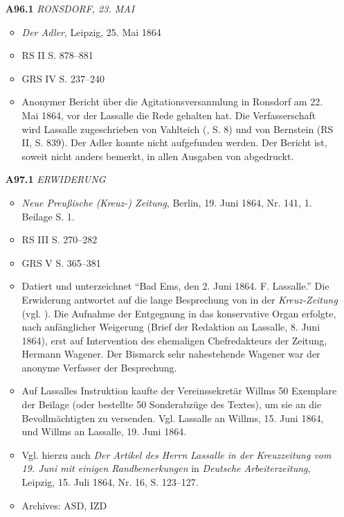 \begin{itemize}
    \item[\textbf{A96.1}] \textit{RONSDORF, 23. MAI}
    \begin{itemize} 
    	\item \textit{Der Adler}, Leipzig, 25. Mai 1864
    	\item RS II S. 878--881
    	\item GRS IV S. 237--240
    	\item Anonymer Bericht über die Agitationsversanmlung in Ronsdorf am 22. Mai 1864, vor der Lassalle die Rede  gehalten hat. Die Verfasserschaft wird Lassalle zugeschrieben von Vahlteich (, S. 8) und von Bernstein (RS II, S. 839). Der Adler konnte nicht aufgefunden werden. Der Bericht ist, soweit nicht anders bemerkt, in allen Ausgaben von  abgedruckt.
    \end{itemize}
    
    \item[\textbf{A97.1}] \textit{ERWIDERUNG}
    \begin{itemize}
        \item \textit{Neue Preußische (Kreuz-) Zeitung}, Berlin, 19. Juni 1864, Nr. 141, 1. Beilage S. 1.
        \item RS III S. 270--282
        \item GRS V S. 365--381
        \item Datiert und unterzeichnet ``Bad Ems, den 2. Juni 1864. F. Lassalle.'' Die Erwiderung antwortet auf die lange Besprechung von  in der \textit{Kreuz-Zeitung} (vgl. ). Die Aufnahme der Entgegnung in das konservative Organ erfolgte, nach anfänglicher Weigerung (Brief der Redaktion an Lassalle, 8. Juni 1864), erst auf Intervention des ehemaligen Chefredakteurs der Zeitung, Hermann Wagener. Der Bismarck sehr nahestehende Wagener war der anonyme Verfasser der Besprechung.
        \item Auf Lassalles Instruktion kaufte der Vereinssekretär Willms 50 Exemplare der Beilage (oder bestellte 50 Sonderabzüge des Textes), um sie an die Bevollmächtigten zu versenden. Vgl. Lassalle an Willms, 15. Juni 1864, und Willms an Lassalle, 19. Juni 1864.
        \item Vgl. hierzu auch \textit{Der Artikel des Herrn Lassalle in der Kreuzzeitung vom 19. Juni mit einigen Randbemerkungen} in \textit{Deutsche Arbeiterzeitung}, Leipzig, 15. Juli 1864, Nr. 16, S. 123--127.
        \item Archives: ASD, IZD
    \end{itemize}
    

\end{itemize}
